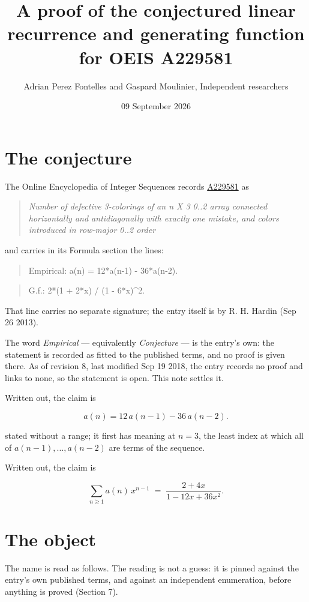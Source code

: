 \documentclass[11pt]{article}
\title{A proof of the conjectured linear recurrence and generating function for OEIS A229581}
\author{Adrian Perez Fontelles and Gaspard Moulinier, Independent researchers}
\date{09 September 2026}
\theoremstyle{definition}
\begin{document}
\maketitle
\section{The conjecture}

The Online Encyclopedia of Integer Sequences records \href{https://oeis.org/A229581}{A229581} as

\begin{quote}\itshape Number of defective 3-colorings of an n X 3 0..2 array connected horizontally and antidiagonally with exactly one mistake, and colors introduced in row-major 0..2 order\end{quote}

and carries in its Formula section the lines:

\begin{quote}\ttfamily Empirical: a(n) = 12*a(n-1) - 36*a(n-2).\end{quote}

\begin{quote}\ttfamily G.f.: 2*(1 + 2*x) / (1 - 6*x)\textasciicircum{}2.\end{quote}

That line carries no separate signature; the entry itself is by R. H. Hardin (Sep 26 2013).

The word {\itshape Empirical} --- equivalently {\itshape Conjecture} --- is the entry's own: the statement is recorded as fitted to the published terms, and no proof is given there. As of revision 8, last modified Sep 19 2018, the entry records no proof and links to none, so the statement is open. This note settles it.

Written out, the claim is

\[a(n) = 12\,a(n-1) - 36\,a(n-2).\]

stated without a range; it first has meaning at $n = 3$, the least index at which all of $a(n-1),\dots,a(n-2)$ are terms of the sequence.

Written out, the claim is

\[\sum_{n \ge 1} a(n)\,x^{n-1} \;=\; \frac{2 + 4x}{1 - 12x + 36x^{2}}.\]

\section{The object}

The name is read as follows. The reading is not a guess: it is pinned against the entry's own published terms, and against an independent enumeration, before anything is proved (Section 7).
\end{document}
